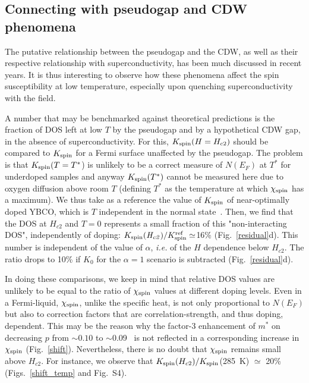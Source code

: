 \documentclass[superscriptaddress,twocolumn,prl,preprintnumbers,amsmath,amssymb]{revtex4}
\begin{document}
\subsection*{Connecting with pseudogap and CDW phenomena}

The putative relationship between the pseudogap and the CDW, as well as their respective relationship with superconductivity, has been much discussed in recent years. It is thus interesting to observe how these phenomena affect the spin susceptibility at low temperature, especially upon quenching superconductivity with the field.

A number that may be benchmarked against theoretical predictions is the fraction of DOS left at low $T$ by the pseudogap and by a hypothetical CDW gap, in the absence of superconductivity. For this, $K_{\rm spin}(H=H_{c2})$ should be compared to $K_{\rm spin}$ for a Fermi surface unaffected by the pseudogap. The problem is that $K_{\rm spin}(T=T^*$) is unlikely to be a correct measure of $N(E_F)$ at $T^*$ for underdoped samples and anyway $K_{\rm spin}(T^*)$  cannot be measured here due to oxygen diffusion above room $T$ (defining $T^*$ as the temperature at which $\chi_{\rm spin}$ has a maximum). We thus take as a reference the value of $K_{\rm spin}$ of near-optimally doped YBCO, which is $T$ independent in the normal state~\cite{Horvatic89}. Then, we find that the DOS at $H_{c2}$ and $T=0$ represents a small fraction of this "non-interacting DOS", independently of doping: $K_{\rm spin}({\it H_{c2})}/K_{\rm spin}^{\rm ref}\simeq$16\% (Fig.~\ref{residual}d). This number is independent of the value of $\alpha$, {\it i.e.} of the $H$ dependence below $H_{c2}$. The ratio drops to 10\% if $K_0$ for the $\alpha=1$ scenario is subtracted (Fig.~\ref{residual}d).

In doing these comparisons, we keep in mind that relative DOS values are unlikely to be equal to the ratio of $\chi_{\rm spin}$ values at different doping levels. Even in a Fermi-liquid, $\chi_{\rm spin}$, unlike the specific heat, is not only proportional to $N(E_F)$ but also to correction factors that are correlation-strength, and thus doping, dependent. This may be the reason why the factor-3 enhancement of $m^*$ on decreasing $p$ from $\sim0.10$ to $\sim$0.09~\cite{Sebastian10} is not reflected in a corresponding increase in $\chi_{\rm spin}$ (Fig.~\ref{shift}). Nevertheless, there is no doubt that $\chi_{\rm spin}$ remains small above $H_{c2}$. For instance, we observe that $K_{\rm spin}(H_{c2})/K_{\rm spin}$(285~K) $\simeq$ 20\% (Figs.~\ref{shift_temp} and Fig.~S4).
\end{document}
